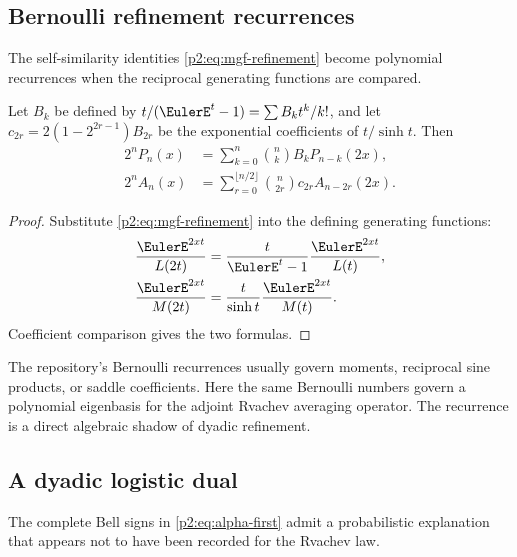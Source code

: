 \documentclass[11pt,oneside]{article}
\numberwithin{equation}{section}
\theoremstyle{definition}
\theoremstyle{remark}
\begin{document}
\subsection{Bernoulli refinement recurrences}

The self-similarity identities \eqref{p2:eq:mgf-refinement} become polynomial recurrences when the
reciprocal generating functions are compared.

\begin{proposition}
\label{p2:prop:Bernoulli-refinement}
Let $B_k$ be defined by $t/(\EulerE^t-1)=\sum B_kt^k/k!$, and let
$c_{2r}=2(1-2^{2r-1})B_{2r}$ be the exponential coefficients of
$t/\sinh t$.  Then
\begin{align}
 2^nP_n(x)
 &=\sum_{k=0}^n\binom nkB_kP_{n-k}(2x),
 \label{p2:eq:P-Bernoulli-refinement}\\
 2^nA_n(x)
 &=\sum_{r=0}^{\lfloor n/2\rfloor}
   \binom n{2r}c_{2r}A_{n-2r}(2x).
 \label{p2:eq:A-Bernoulli-refinement}
\end{align}
\end{proposition}

\begin{proof}
Substitute \eqref{p2:eq:mgf-refinement} into the defining generating functions:
\begin{align*}
 \frac{\EulerE^{2xt}}{L(2t)}
 &=\frac{t}{\EulerE^t-1}\frac{\EulerE^{2xt}}{L(t)},\\
 \frac{\EulerE^{2xt}}{M(2t)}
 &=\frac{t}{\sinh t}\frac{\EulerE^{2xt}}{M(t)}.
\end{align*}
Coefficient comparison gives the two formulas.
\end{proof}

\begin{remark}
The repository's Bernoulli recurrences usually govern moments, reciprocal sine products, or saddle
coefficients.  Here the same Bernoulli numbers govern a polynomial eigenbasis for the adjoint
Rvachev averaging operator.  The recurrence is a direct algebraic shadow of dyadic refinement.
\end{remark}

\subsection{A dyadic logistic dual}

The complete Bell signs in \eqref{p2:eq:alpha-first} admit a probabilistic explanation that appears not
to have been recorded for the Rvachev law.
\end{document}
